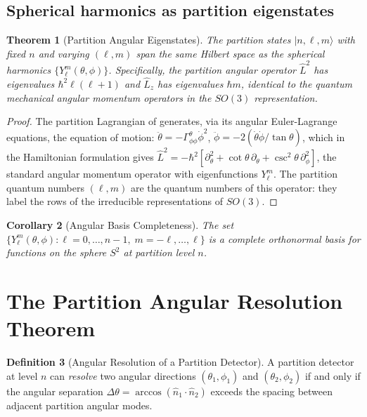 \documentclass[twocolumn,10pt,a4paper]{article}
\theoremstyle{thmstyle}
\newtheorem{theorem}{Theorem}[section]
\newtheorem{corollary}[theorem]{Corollary}
\theoremstyle{definition}
\newtheorem{definition}[theorem]{Definition}
\theoremstyle{remark}
\newcommand{\Ylm}{Y_\ell^m}
\begin{document}
\subsection{Spherical harmonics as partition eigenstates}

\begin{theorem}[Partition Angular Eigenstates]
\label{thm:spherical_harmonics}
The partition states $|n,\ell,m\rangle$ with fixed $n$ and varying
$(\ell,m)$ span the same Hilbert space as the spherical harmonics
$\{\Ylm(\theta,\phi)\}$. Specifically, the partition angular operator
$\hat{L}^2$ has eigenvalues $\hbar^2\ell(\ell+1)$ and $\hat{L}_z$
has eigenvalues $\hbar m$, identical to the quantum mechanical
angular momentum operators in the $SO(3)$ representation.
\end{theorem}

\begin{proof}
The partition Lagrangian of \citet{companion:spectrometer} generates,
via its angular Euler-Lagrange equations, the equation of motion:
$\ddot\theta = -\Gamma^\theta_{\phi\phi}\dot\phi^2$,
$\ddot\phi = -2(\dot\theta\dot\phi/\tan\theta)$,
which in the Hamiltonian formulation gives
$\hat{L}^2 = -\hbar^2[\partial_\theta^2 + \cot\theta\,\partial_\theta
+ \csc^2\theta\,\partial_\phi^2]$,
the standard angular momentum operator with eigenfunctions $\Ylm$.
The partition quantum numbers $(\ell,m)$ are the quantum numbers of
this operator: they label the rows of the irreducible representations
of $SO(3)$.
\end{proof}

\begin{corollary}[Angular Basis Completeness]
The set $\{\Ylm(\theta,\phi) : \ell = 0,\ldots,n-1,\; m = -\ell,\ldots,\ell\}$
is a complete orthonormal basis for functions on the sphere $S^2$ at
partition level $n$.
\end{corollary}

\section{The Partition Angular Resolution Theorem}
\label{sec:resolution}

\begin{definition}[Angular Resolution of a Partition Detector]
\label{def:ang_res}
A partition detector at level $n$ can \emph{resolve} two angular
directions $(\theta_1,\phi_1)$ and $(\theta_2,\phi_2)$ if and only if
the angular separation $\Delta\theta = \arccos(\hat{n}_1\cdot\hat{n}_2)$
exceeds the spacing between adjacent partition angular modes.
\end{definition}
\end{document}
